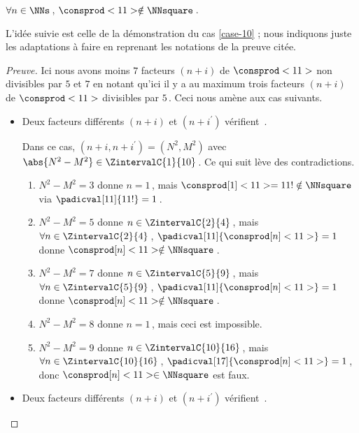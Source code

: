 \begin{fact} \label{case-11}
	 $\forall n \in \NNs$\,, $\consprod<11> \notin \NNsquare$\,.
\end{fact}



L'idée suivie est celle de la démonstration du cas \ref{case-10} ; nous indiquons juste les adaptations à faire en reprenant les notations de la preuve citée.


\begin{proof}[Preuve]%
    Ici nous avons moins $7$ facteurs $(n + i)$ de $\consprod<11>$ non divisibles par $5$ et $7$ en notant qu'ici il y a au maximum trois facteurs $(n + i)$ de $\consprod<11>$ divisibles par $5$\,. Ceci nous amène aux cas suivants.
    \begin{itemize}
    	\medskip
		\item Deux facteurs différents $(n+i)$ et $(n+i^\prime)$ vérifient \,.
		
		\smallskip
		\noindent
		Dans ce cas, $(n+i, n+i^\prime) = (N^2, M^2)$ avec $\abs{N^2 - M^2} \in \ZintervalC{1}{10}$\,. Ce qui suit lève des contradictions.
		\begin{enumerate}
			\item $N^2 - M^2 = 3$ donne $n = 1$\,, mais $\consprod[1]<11> = 11 ! \notin \NNsquare$ via $\padicval[11]{11!} = 1$\,.


			\item $N^2 - M^2 = 5$ donne $n \in \ZintervalC{2}{4}$\,, mais $\forall n \in \ZintervalC{2}{4}$\,, $\padicval[11]{\consprod[n]<11>} = 1$ donne $\consprod[n]<11> \notin \NNsquare$\,.
			

			\item $N^2 - M^2 = 7$ donne $n \in \ZintervalC{5}{9}$\,, mais $\forall n \in \ZintervalC{5}{9}$\,, $\padicval[11]{\consprod[n]<11>} = 1$ donne $\consprod[n]<11> \notin \NNsquare$\,.


			\item $N^2 - M^2 = 8$ donne $n = 1$\,, mais ceci est impossible.

			\item $N^2 - M^2 = 9$ donne $n \in \ZintervalC{10}{16}$\,, mais $\forall n \in \ZintervalC{10}{16}$\,, $\padicval[17]{\consprod[n]<11>} = 1$\,, donc $\consprod[n]<11> \in \NNsquare$ est faux.
		\end{enumerate}


    	\medskip
		\item Deux facteurs différents $(n+i)$ et $(n+i^\prime)$ vérifient \,.
		

\end{itemize}
\end{proof}
